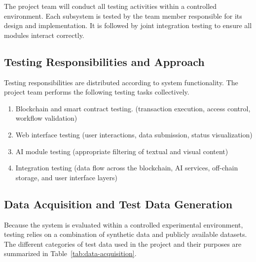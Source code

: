 The project team will conduct all testing activities within a controlled environment. Each subsystem is tested by the team member responsible for its design and implementation. It is followed by joint integration testing to ensure all modules interact correctly. 

\subsection{Testing Responsibilities and Approach}

Testing responsibilities are distributed according to system functionality. The project team performs the following testing tasks collectively. 
\begin{enumerate}[i]
    \item Blockchain and smart contract testing. (transaction execution,
    access control, workflow validation)
    \item Web interface testing (user interactions, data submission, status visualization)
    \item AI module testing (appropriate filtering of textual and visual
    content)
    \item Integration testing (data flow across the blockchain, AI services,
    off-chain storage, and user interface layers)
\end{enumerate}

\subsection{Data Acquisition and Test Data Generation}

Because the system is evaluated within a controlled experimental environment, testing relies on a combination of synthetic data and publicly available datasets. The different categories of test data used in the project and their purposes are summarized in Table~\ref{tab:data-acquisition}.

